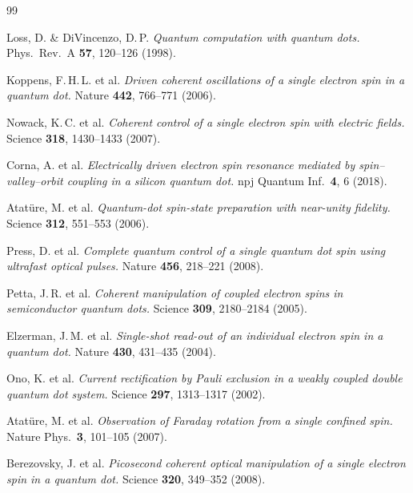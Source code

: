 \begin{thebibliography}{99}

Loss, D. \& DiVincenzo, D.\,P.
\textit{Quantum computation with quantum dots.}
Phys.\ Rev.\ A \textbf{57}, 120--126 (1998).

Koppens, F.\,H.\,L. et al.
\textit{Driven coherent oscillations of a single electron spin in a quantum dot.}
Nature \textbf{442}, 766--771 (2006).

Nowack, K.\,C. et al.
\textit{Coherent control of a single electron spin with electric fields.}
Science \textbf{318}, 1430--1433 (2007).

Corna, A. et al.
\textit{Electrically driven electron spin resonance mediated by
spin--valley--orbit coupling in a silicon quantum dot.}
npj Quantum Inf.\ \textbf{4}, 6 (2018).

Atatüre, M. et al.
\textit{Quantum-dot spin-state preparation with near-unity fidelity.}
Science \textbf{312}, 551--553 (2006).

Press, D. et al.
\textit{Complete quantum control of a single quantum dot spin using
ultrafast optical pulses.}
Nature \textbf{456}, 218--221 (2008).

Petta, J.\,R. et al.
\textit{Coherent manipulation of coupled electron spins in semiconductor
quantum dots.}
Science \textbf{309}, 2180--2184 (2005).

Elzerman, J.\,M. et al.
\textit{Single-shot read-out of an individual electron spin in a quantum dot.}
Nature \textbf{430}, 431--435 (2004).

Ono, K. et al.
\textit{Current rectification by Pauli exclusion in a weakly coupled
double quantum dot system.}
Science \textbf{297}, 1313--1317 (2002).

Atatüre, M. et al.
\textit{Observation of Faraday rotation from a single confined spin.}
Nature Phys.\ \textbf{3}, 101--105 (2007).

Berezovsky, J. et al.
\textit{Picosecond coherent optical manipulation of a single electron spin in a
quantum dot.}
Science \textbf{320}, 349--352 (2008).


\end{thebibliography}
